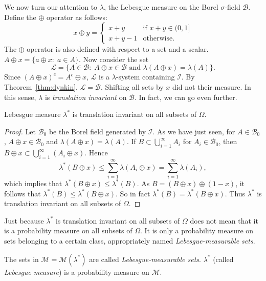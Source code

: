 \documentclass[11pt,fleqn]{book} %
\begin{document}
\vspace{10pt}
We now turn our attention to $\lambda$, the Lebesgue measure on the Borel $\sigma$-field $\mathcal{B}$. Define the $\oplus$ operator as follows:
\[
	x \oplus y = \begin{cases}
		x+y & \textrm{if } x + y \in (0,1] \\
		x+y-1 & \textrm{otherwise}.
	\end{cases}
\]
The $\oplus$ operator is also defined with respect to a set and a scalar. $A \oplus x = \{a \oplus x:\;a \in A\}$. Now consider the set
\[
	\mathcal{L} = \{A \in \mathcal{B}:\;A \oplus x \in \mathcal{B} \textrm{ and } \lambda(A \oplus x) = \lambda(A)\}.
\]
Since $(A \oplus x)^c = A^c \oplus x$, $\mathcal{L}$ is a $\lambda$-system containing $\mathcal{I}$. By Theorem~\ref{thm:dynkin}, $\mathcal{L}=\mathcal{B}$. Shifting all sets by $x$ did not their measure. In this sense, $\lambda$ is \emph{translation invariant} on $\mathcal{B}$. In fact, we can go even further.

\begin{theorem} \label{thm:trans-invar}
	Lebesgue measure $\lambda^*$ is translation invariant on all subsets of $\Omega$.
\end{theorem}

\begin{proof}
	Let $\mathcal{B}_0$ be the Borel field generated by $\mathcal{I}$. As we have just seen, for $A \in \mathcal{B}_0$, $A \oplus x \in \mathcal{B}_0$ and $\lambda(A \oplus x) = \lambda(A)$. If $B \subset \bigcup_{i=1}^\infty A_i$ for $A_i \in \mathcal{B}_0$, then $B \oplus x \subset \bigcup_{i=1}^\infty (A_i \oplus x)$. Hence
	\[
		\lambda^*(B \oplus x) \leq \sum_{i=1}^\infty \lambda(A_i \oplus x) = \sum_{i=1}^\infty \lambda(A_i),
	\]
	which implies that $\lambda^*(B \oplus x) \leq \lambda^*(B)$. As $B = (B \oplus x) \oplus (1-x)$, it follows that $\lambda^*(B) \leq \lambda^*(B \oplus x)$. So in fact $\lambda^*(B) = \lambda^*(B \oplus x)$. Thus $\lambda^*$ is translation invariant on all subsets of $\Omega$.
\end{proof}

Just because $\lambda^*$ is translation invariant on all subsets of $\Omega$ does not mean that it is a probability measure on all subsets of $\Omega$. It is only a probability measure on sets belonging to a certain class, appropriately named \emph{Lebesgue-measurable sets}.

\begin{definition} \label{def:lebesgue-measurable}
	The sets in $\mathcal{M}=\mathcal{M}(\lambda^*)$ are called \emph{Lebesgue-measurable sets}. $\lambda^*$ (called \emph{Lebesgue measure}) is a probability measure on $\mathcal{M}$.
\end{definition}
\end{document}
